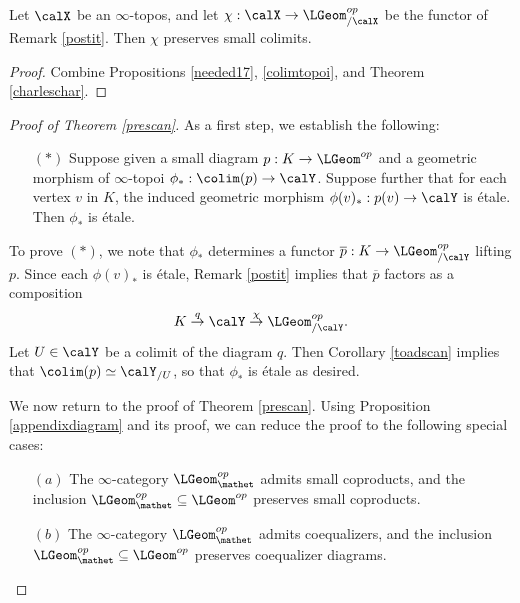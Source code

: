 \begin{proposition}\label{toadsteal}
Let $\calX$ be an $\infty$-topos, and let $\chi: \calX \rightarrow \LGeom^{op}_{/ \calX}$ be
the functor of Remark \ref{postit}. Then $\chi$ preserves small colimits.
\end{proposition}

\begin{proof}
Combine Propositions \ref{needed17}, \ref{colimtopoi}, and Theorem \ref{charleschar}.
\end{proof}

\begin{proof}[Proof of Theorem \ref{prescan}]
As a first step, we establish the following:
\begin{itemize}
\item[$(\ast)$] Suppose given a small diagram $p: K \rightarrow \LGeom^{op}$ 
and a geometric morphism of $\infty$-topoi $\phi_{\ast}: \colim(p) \rightarrow \calY$. Suppose
further that for each vertex $v$ in $K$, the induced geometric morphism
$\phi(v)_{\ast}: p(v) \rightarrow \calY$ is \'{e}tale. Then $\phi_{\ast}$ is \'{e}tale.
\end{itemize}
To prove $(\ast)$, we note that $\phi_{\ast}$ determines a functor
$\overline{p}: K \rightarrow \LGeom^{op}_{/\calY}$ lifting $p$. Since
each $\phi(v)_{\ast}$ is \'{e}tale, Remark \ref{postit} implies that 
$\overline{p}$ factors as a composition
$$ K \stackrel{q}{\rightarrow} \calY \stackrel{\chi}{\rightarrow} \LGeom^{op}_{/\calY}.$$
Let $U \in \calY$ be a colimit of the diagram $q$. Then Corollary \ref{toadscan} implies that
$\colim(p) \simeq \calY_{/U}$, so that $\phi_{\ast}$ is \'{e}tale as desired.

We now return to the proof of Theorem \ref{prescan}. Using Proposition \ref{appendixdiagram} and its proof, we can reduce the proof to the following special cases:
\begin{itemize}
\item[$(a)$] The $\infty$-category $\LGeom^{op}_{\mathet}$ admits small coproducts, and
the inclusion $\LGeom^{op}_{\mathet} \subseteq \LGeom^{op}$ preserves small coproducts.
\item[$(b)$] The $\infty$-category $\LGeom^{op}_{\mathet}$ admits coequalizers, and the inclusion
$\LGeom^{op}_{\mathet} \subseteq \LGeom^{op}$ preserves coequalizer diagrams.
\end{itemize}


\end{proof}
